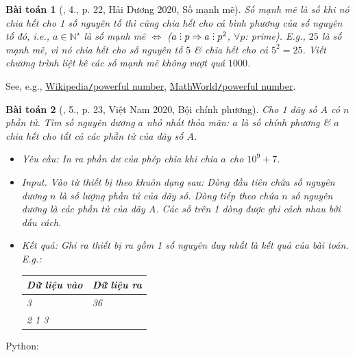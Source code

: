 \documentclass{article}
\newtheorem{baitoan}{Bài toán}
\DeclareRobustCommand{\divby}{%
	\mathrel{\vbox{\baselineskip.65ex\lineskiplimit0pt\hbox{.}\hbox{.}\hbox{.}}}%
}
\begin{document}
\begin{baitoan}[\cite{VietSTEM2021}, 4., p. 22, Hải Dương 2020, Số mạnh mẽ]
	\emph{Số mạnh mẽ} là số khi nó chia hết cho 1 số nguyên tố thì cũng chia hết cho cả bình phương của số nguyên tố đó, i.e., $a\in\mathbb{N}^\star$ là số mạnh mẽ $\Leftrightarrow$ ($a\divby p\Rightarrow a\divby p^2$, $\forall p$: prime). E.g., $25$ là số mạnh mẽ, vì nó chia hết cho số nguyên tố $5$ \& chia hết cho cả $5^2 = 25$. Viết chương trình liệt kê các số mạnh mẽ không vượt quá $1000$.
\end{baitoan}
See, e.g., \href{https://en.wikipedia.org/wiki/Powerful_number}{Wikipedia{\tt /}powerful number}, \href{https://mathworld.wolfram.com/PowerfulNumber.html}{MathWorld{\tt /}powerful number}.

\begin{baitoan}[\cite{VietSTEM2021}, 5., p. 23, Việt Nam 2020, Bội chính phương]
	Cho 1 dãy số $A$ có $n$ phần tử. Tìm số nguyên dương $a$ nhỏ nhất thỏa mãn: $a$ là số chính phương \& $a$ chia hết cho tất cả các phần tử của dãy số $A$.
	\begin{itemize}
		\item {\sf Yêu cầu:} In ra phần dư của phép chia khi chia $a$ cho $10^9 + 7$.
		\item {\sf Input.} Vào từ thiết bị theo khuôn dạng sau: Dòng đầu tiên chứa số nguyên dương $n$ là số lượng phần tử của dãy số. Dòng tiếp theo chứa $n$ số nguyên dương là các phần tử của dãy $A$. Các số trên 1 dòng được ghi cách nhau bởi dấu cách.
		\item {\sf Kết quả:} Ghi ra thiết bị ra gồm 1 số nguyên duy nhất là kết quả của bài toán. E.g.:
		\begin{table}[H]
			\centering
			\begin{tabular}{|l|l|}
				\hline
				Dữ liệu vào & Dữ liệu ra \\
				\hline
				3 & 36 \\
				2 1 3 &  \\
				\hline
			\end{tabular}
		\end{table}
	\end{itemize}
\end{baitoan}
Python:
\begin{Verbatim}[numbers=left,xleftmargin=5mm]

\end{Verbatim}
\end{document}
